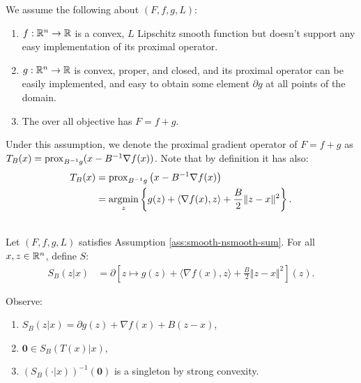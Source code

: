 \documentclass[12pt]{article}
\begin{document}
    \begin{assumption}\label{ass:smooth-nsmooth-sum}
        We assume the following about $(F, f, g, L)$: 
        \begin{enumerate}[nosep]
            \item $f: \mathbb R^n \rightarrow \mathbb R$ is a convex, $L$ Lipschitz smooth function but doesn't support any easy implementation of its proximal operator. 
            \item $g: \mathbb R^n \rightarrow \mathbb R$ is convex, proper, and closed, and its proximal operator can be easily implemented, and easy to obtain some element $\partial g$ at all points of the domain. 
            \item The over all objective has $F = f + g$. 
        \end{enumerate}
        Under this assumption, we denote the proximal gradient operator of $F = f+ g$ as $T_B(x) = \operatorname{prox}_{B^{-1}g}(x - B^{-1}\nabla f(x))$. 
        Note that by definition it has also:
        \begin{align*}
            T_B(x) &= 
            \operatorname{prox}_{B^{-1}g}\left(
                x - B^{-1}\nabla f(x)
            \right)
            \\
            &= \mathop{\rm argmin}\limits_{z}\left\lbrace
                g(z)
                + \langle \nabla f(x), z\rangle
                + \frac{B}{2}\Vert z - x \Vert^2
            \right\rbrace. 
        \end{align*}
    \end{assumption}
    \begin{definition}\;\\
        Let $(F, f, g, L)$ satisfies Assumption \ref{ass:smooth-nsmooth-sum}. 
        For all $x, z \in \mathbb R^n$, define $S$: 
        \begin{align*}
            S_B(z | x) &= \partial 
            \left[
                z \mapsto g(z)
                + \langle \nabla f(x), z\rangle
                + \frac{B}{2}\Vert z - x \Vert^2
            \right](z). 
        \end{align*}
    \end{definition}
    Observe: 
    \begin{enumerate}[nosep]
        \item $S_B(z | x) = \partial g(z) + \nabla f(x)+ B(z - x)$,
        \item $\mathbf 0 \in S_B(T(x) | x)$, 
        \item $(S_B(\cdot | x))^{-1}(\mathbf 0)$ is a singleton by strong convexity. 
    \end{enumerate}
\end{document}
